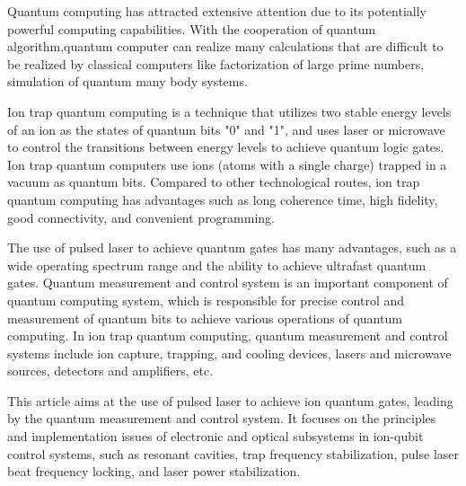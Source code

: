 \begin{abstract*}
  Quantum computing has attracted extensive attention due to its potentially powerful computing capabilities. With the cooperation of quantum algorithm,quantum computer can realize many calculations that are difficult to be realized by classical computers like factorization of large prime numbers, simulation of quantum many body systems. 


  Ion trap quantum computing is a technique that utilizes two stable energy levels of an ion as the states of quantum bits "0" and "1", and uses laser or microwave to control the transitions between energy levels to achieve quantum logic gates. Ion trap quantum computers use ions (atoms with a single charge) trapped in a vacuum as quantum bits. Compared to other technological routes, ion trap quantum computing has advantages such as long coherence time, high fidelity, good connectivity, and convenient programming.

  The use of pulsed laser to achieve quantum gates has many advantages, such as a wide operating spectrum range and the ability to achieve ultrafast quantum gates. Quantum measurement and control system is an important component of quantum computing system, which is responsible for precise control and measurement of quantum bits to achieve various operations of quantum computing. In ion trap quantum computing, quantum measurement and control systems include ion capture, trapping, and cooling devices, lasers and microwave sources, detectors and amplifiers, etc.

  This article aims at the use of pulsed laser to achieve ion quantum gates, leading by the quantum measurement and control system. It focuses on the principles and implementation issues of electronic and optical subsystems in ion-qubit control systems, such as resonant cavities, trap frequency stabilization, pulse laser beat frequency locking, and laser power stabilization.

\end{abstract*}
